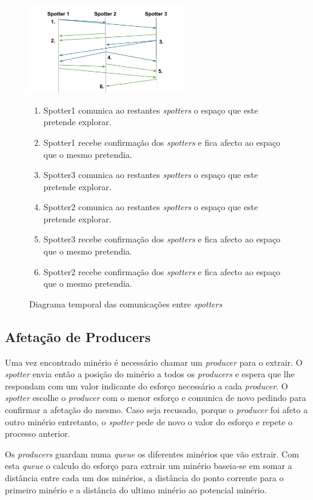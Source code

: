 \documentclass[12pt]{report}
\begin{document}
\begin{figure}[h]
  \centering
    \includegraphics[width=0.6\textwidth]{spotter-agreement}
  \caption{\small{Diagrama temporal das comunicações entre \emph{spotters}}}
  
  \begin{enumerate}
    \item Spotter1 comunica ao restantes \emph{spotters} o espaço que este pretende explorar.
    \item Spotter1 recebe confirmação dos \emph{spotters} e fica afecto ao espaço que o mesmo pretendia.
    \item Spotter3 comunica ao restantes \emph{spotters} o espaço que este pretende explorar.
    \item Spotter2 comunica ao restantes \emph{spotters} o espaço que este pretende explorar.
    \item Spotter3 recebe confirmação dos \emph{spotters} e fica afecto ao espaço que o mesmo pretendia.
    \item Spotter2 recebe confirmação dos \emph{spotters} e fica afecto ao espaço que o mesmo pretendia.
  \end{enumerate}
\end{figure}

\FloatBarrier
\subsection{Afetação de Producers}
Uma vez encontrado minério é necessário chamar um \emph{producer} para o extrair. O \emph{spotter} envia então a posição do 
minério a todos os \emph{producers} e espera que lhe respondam com um valor indicante do esforço necessário a cada \emph{producer}.
O \emph{spotter} escolhe o \emph{producer} com o menor esforço e comunica de novo pedindo para confirmar a afetação do mesmo.
Caso seja recusado, porque o \emph{producer} foi afeto a outro minério entretanto, o \emph{spotter} pede de novo o valor do esforço
e repete o processo anterior.

Os \emph{producers} guardam numa \emph{queue} os diferentes minérios que vão extrair. Com esta \emph{queue} o calculo do esforço
para extrair um minério baseia-se em somar a distância entre cada um dos minérios, a distância do ponto corrente para o primeiro
minério e a distância do ultimo minério ao potencial minério.
\end{document}
